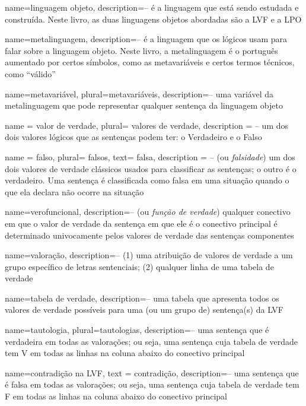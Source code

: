 {
 name=linguagem objeto,
 description={-- é a linguagem que está sendo estudada e construída. Neste livro, as duas linguagens objetos abordadas são a LVF e a LPO}
}

{
 name=metalinguagem,
 description={-- é a linguagem que os lógicos usam para falar sobre a linguagem objeto. Neste livro, a metalinguagem é o português aumentado por certos símbolos, como as metavariáveis e certos termos técnicos, como ``válido''}
}

{
 name=metavariável,
 plural=metavariáveis,
 description={-- uma variável da metalinguagem que pode representar qualquer sentença da linguagem objeto}
}

{
 name = valor de verdade,
 plural= valores de verdade,
 description = {-- um dos dois valores lógicos que as sentenças podem ter: o Verdadeiro e o Falso}
}

{
 name = falso,
 plural= falsos,
 text= falsa,
 description = {-- (ou \textit{falsidade}) um dos dois valores de verdade clássicos usados para classificar as sentenças; o outro é o verdadeiro. Uma sentença é classificada como falsa em uma situação quando o que ela declara não ocorre na situação}
}

{
 name=verofuncional,
 description={-- (ou \textit{função de verdade}) qualquer conectivo em que o valor de verdade da sentença em que ele é o conectivo principal é determinado univocamente pelos valores de verdade das sentenças componentes}
}

{
 name=valoração,
 description={-- (1) uma atribuição de valores de verdade a um grupo específico de letras sentenciais; (2) qualquer linha de uma tabela de verdade}
}

{
 name=tabela de verdade,
 description={-- uma tabela que apresenta todos os valores de verdade possíveis para uma (ou um grupo de) sentença(s) da LVF}
}

{
 name=tautologia,
 plural=tautologias,
 description={-- uma sentença que é verdadeira em todas as valorações; ou seja, uma sentença cuja tabela de verdade tem V em todas as linhas na coluna abaixo do conectivo principal}
}

{
 name=contradição na LVF,
 text = contradição,
 description={-- uma sentença que é falsa em todas as valorações; ou seja, uma sentença cuja tabela de verdade tem F em todas as linhas na coluna abaixo do conectivo principal}
}

